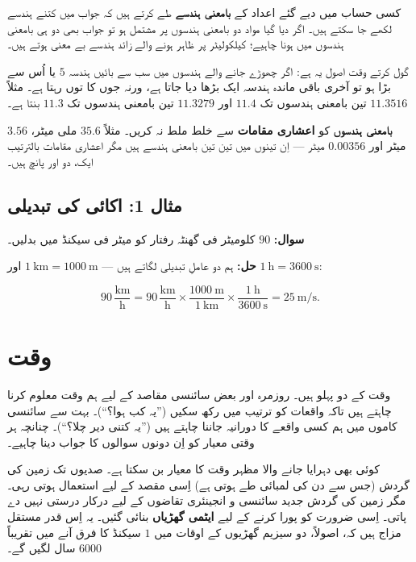 \documentclass{urdu-textbook}
\begin{document}
کسی حساب میں دیے گئے اعداد کے \textbf{بامعنی ہندسے} طے کرتے ہیں کہ جواب
میں کتنے ہندسے لکھے جا سکتے ہیں۔ اگر دیا گیا مواد دو بامعنی ہندسوں پر
مشتمل ہو تو جواب بھی دو ہی بامعنی ہندسوں میں ہونا چاہیے؛ کیلکولیٹر پر
ظاہر ہونے والے زائد ہندسے بے معنی ہوتے ہیں۔

گول کرتے وقت اصول یہ ہے: اگر چھوڑے جانے والے ہندسوں میں سب سے بائیں
ہندسہ \(5\) یا اُس سے بڑا ہو تو آخری باقی ماندہ ہندسہ ایک بڑھا دیا جاتا
ہے، ورنہ جوں کا توں رہتا ہے۔ مثلاً \(11.3516\) تین بامعنی ہندسوں تک
\(11.4\) اور \(11.3279\) تین بامعنی ہندسوں تک \(11.3\) بنتا ہے۔

\textbf{بامعنی ہندسوں} کو \textbf{اعشاری مقامات} سے خلط ملط نہ کریں۔
مثلاً \(35.6\) ملی میٹر، \(3.56\) میٹر اور \(0.00356\) میٹر --- اِن تینوں
میں تین تین بامعنی ہندسے ہیں مگر اعشاری مقامات بالترتیب ایک، دو اور پانچ
ہیں۔

\hypertarget{ux645ux62bux627ux644-1-ux627ux6a9ux627ux626ux6cc-ux6a9ux6cc-ux62aux628ux62fux6ccux644ux6cc}{%
\subsection{مثال 1: اکائی کی
تبدیلی}\label{ux645ux62bux627ux644-1-ux627ux6a9ux627ux626ux6cc-ux6a9ux6cc-ux62aux628ux62fux6ccux644ux6cc}}

\textbf{سوال:} \(90\) کلومیٹر فی گھنٹہ رفتار کو میٹر فی سیکنڈ میں بدلیں۔

\textbf{حل:} ہم دو عاملِ تبدیلی لگاتے ہیں ---
\(1\ \mathrm{km}=1000\ \mathrm{m}\) اور
\(1\ \mathrm{h}=3600\ \mathrm{s}\):

\[90\,\frac{\mathrm{km}}{\mathrm{h}} = 90\,\frac{\mathrm{km}}{\mathrm{h}}\times\frac{1000\ \mathrm{m}}{1\ \mathrm{km}}\times\frac{1\ \mathrm{h}}{3600\ \mathrm{s}} = 25\ \mathrm{m/s}.\]

\hypertarget{ux648ux642ux62a}{%
\section{وقت}\label{ux648ux642ux62a}}

وقت کے دو پہلو ہیں۔ روزمرہ اور بعض سائنسی مقاصد کے لیے ہم وقت معلوم کرنا
چاہتے ہیں تاکہ واقعات کو ترتیب میں رکھ سکیں (”یہ کب ہوا؟“)۔ بہت سے
سائنسی کاموں میں ہم کسی واقعے کا دورانیہ جاننا چاہتے ہیں (''یہ کتنی دیر
چلا؟``)۔ چنانچہ ہر وقتی معیار کو اِن دونوں سوالوں کا جواب دینا چاہیے۔

کوئی بھی دہرایا جانے والا مظہر وقت کا معیار بن سکتا ہے۔ صدیوں تک زمین کی
گردش (جس سے دن کی لمبائی طے ہوتی ہے) اِسی مقصد کے لیے استعمال ہوتی رہی۔
مگر زمین کی گردش جدید سائنسی و انجینئری تقاضوں کے لیے درکار درستی نہیں
دے پاتی۔ اِسی ضرورت کو پورا کرنے کے لیے \textbf{ایٹمی گھڑیاں} بنائی گئیں۔
یہ اِس قدر مستقل مزاج ہیں کہ، اصولاً، دو سیزیم گھڑیوں کے اوقات میں \(1\)
سیکنڈ کا فرق آنے میں تقریباً \(6000\) سال لگیں گے۔
\end{document}
